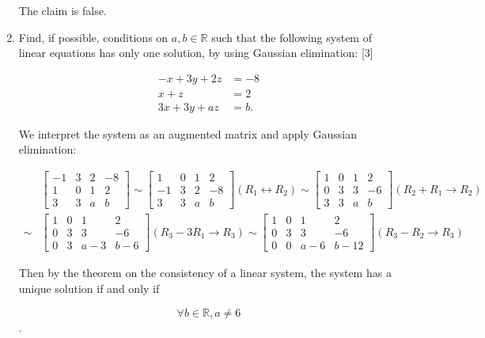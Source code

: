 \documentclass[11pt]{article}
\begin{document}
\begin{enumerate}
    The claim is false.

    \color{black}
    \newpage
    \item Find, if possible, conditions on \(a,b\in \mathbb{R}\) such that the following system of linear equations
    has only one solution, by using Gaussian elimination: \hfill [3]

    \[
    \begin{aligned}
        -x+3y+2z &= -8\\
        x+z &= 2\\
        3x+3y+az &= b.
    \end{aligned}
    \]
    \color{blue}

    We interpret the system as an augmented matrix and apply Gaussian elimination:

    \(
        \begin{aligned}
            &\left[
                \begin{array}{ccc|c}
                    -1 & 3 & 2 & -8\\
                    1 & 0 & 1 & 2\\
                    3 & 3 & a & b
                \end{array}
            \right] \sim
            \left[
                \begin{array}{ccc|c}
                    1 & 0 & 1 & 2\\
                    -1 & 3 & 2 & -8\\
                    3 & 3 & a & b
                \end{array}
            \right] \left(R_1 \leftrightarrow R_2\right) \sim
            \left[
                \begin{array}{ccc|c}
                    1 & 0 & 1 & 2\\
                    0 & 3 & 3 & -6\\
                    3 & 3 & a & b
                \end{array}
            \right] \left(R_2+ R_1 \rightarrow R_2\right)\\
            \sim &\left[
                \begin{array}{ccc|c}
                    1 & 0 & 1 & 2\\
                    0 & 3 & 3 & -6\\
                    0 & 3 & a-3 & b-6
                \end{array}
            \right] \left(R_3 - 3R_1 \rightarrow R_3\right) \sim
            \left[
                \begin{array}{ccc|c}
                    1 & 0 & 1 & 2\\
                    0 & 3 & 3 & -6\\
                    0 & 0 & a-6 & b-12
                \end{array}
            \right] \left(R_3 - R_2 \rightarrow R_3\right)
        \end{aligned}
    \)

    Then by the theorem on the consistency of a linear system, the system has a unique solution if and only if 
    
    \[\forall b\in\mathbb{R}, a \neq 6\].
\end{enumerate}
\end{document}
